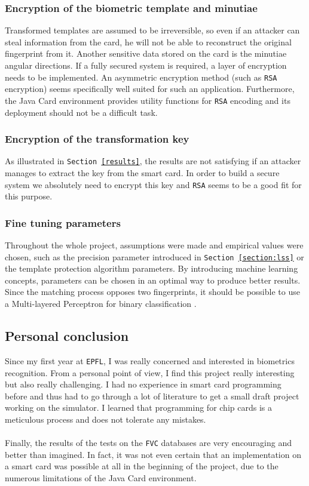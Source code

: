 \documentclass[a4paper,12pt]{article}
\begin{document}
\subsubsection{Encryption of the biometric template and minutiae}
Transformed templates are assumed to be irreversible, so even if an attacker can steal information from the card, he will not be able to reconstruct the original fingerprint from it. Another sensitive data stored on the card is the minutiae angular directions. If a fully secured system is required, a layer of encryption needs to be implemented. An asymmetric encryption method (such as \texttt{RSA} encryption) seems specifically well suited for such an application. Furthermore, the Java Card environment provides utility functions for \texttt{RSA} encoding and its deployment should not be a difficult task.
\subsubsection{Encryption of the transformation key}
\label{keyencryption}
As illustrated in \texttt{Section \ref{results}}, the results are not satisfying if an attacker manages to extract the key from the smart card. In order to build a secure system we absolutely need to encrypt this key and \texttt{RSA} seems to be a good fit for this purpose.


\subsubsection{Fine tuning parameters}
\label{tuning}
Throughout the whole project, assumptions were made and empirical values were chosen, such as the precision parameter introduced in \texttt{Section \ref{section:lss}} or the template protection algorithm parameters. By introducing machine learning concepts, parameters can be chosen in an optimal way to produce better results. Since the matching process opposes two fingerprints, it should be possible to use a Multi-layered Perceptron for binary classification \cite{perceptron}.
\subsection{Personal conclusion}
Since my first year at \texttt{EPFL}, I was really concerned and interested in biometrics recognition. From a personal point of view, I find this project really interesting but also really challenging. I had no experience in smart card programming before and thus had to go through a lot of literature to get a small draft project working on the simulator. I learned that programming for chip cards is a meticulous process and does not tolerate any mistakes.\\\\
Finally, the results of the tests on the \texttt{FVC} databases are very encouraging and better than imagined. In fact, it was not even certain that an implementation on a smart card was possible at all in the beginning of the project, due to the numerous limitations of the Java Card environment.\\\\
\newpage
\end{document}
